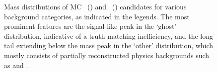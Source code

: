 \begin{figure}
\begin{subfigure}[b]{0.5\textwidth}
    \caption{\DpToKpipi}
    \label{fig:prod:effs:truth:categories:DpToKpipi}
  \end{subfigure}
  \caption{%
    Mass distributions of \ac{MC} 
    \PDzero~() and 
    \PDplus~() candidates for 
    various background categories, as indicated in the legends.
    The most prominent features are the signal-like peak in the `ghost' 
    distribution, indicative of a truth-matching inefficiency, and the long 
    tail extending below the mass peak in the `other' distribution, which 
    mostly consists of partially reconstructed physics backgrounds such as 
    \decay{\PDzero}{\PKminus\Ppiplus\Ppizero} and 
    \decay{\PDplus}{\PKminus\Ppiplus\Ppiplus\Ppizero}.
  }
  \label{fig:prod:effs:truth:categories}
\end{figure}


